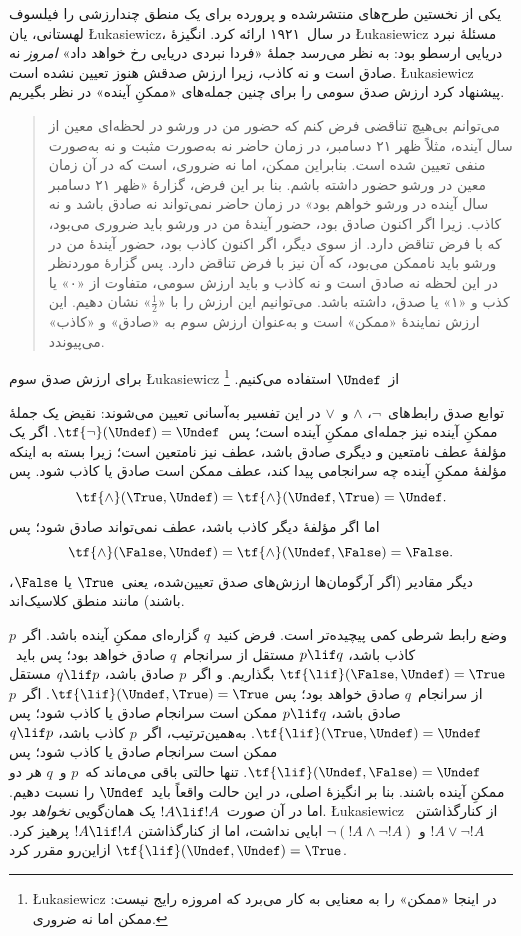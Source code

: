 \documentclass[../../../include/open-logic-section]{subfiles}
\begin{document}


یکی از نخستین طرح‌های منتشرشده و پرورده برای یک منطق چندارزشی را
فیلسوف لهستانی، یان \L ukasiewicz، در سال~۱۹۲۱ ارائه کرد. انگیزهٔ
\L ukasiewicz مسئلهٔ نبرد دریایی ارسطو بود: به نظر می‌رسد جملهٔ «فردا
نبردی دریایی رخ خواهد داد» \emph{امروز} نه صادق است و نه کاذب، زیرا
ارزش صدقش هنوز تعیین نشده است. \L ukasiewicz پیشنهاد کرد ارزش صدق
سومی را برای چنین جمله‌های «ممکنِ آینده» در نظر بگیریم.
\begin{quote}
می‌توانم بی‌هیچ تناقضی فرض کنم که حضور من در ورشو در لحظه‌ای معین از
سال آینده، مثلاً ظهر ۲۱ دسامبر، در زمان حاضر نه به‌صورت مثبت و نه
به‌صورت منفی تعیین شده است. بنابراین ممکن، اما نه ضروری، است که در آن
زمان معین در ورشو حضور داشته باشم. بنا بر این فرض، گزارهٔ «ظهر ۲۱
دسامبر سال آینده در ورشو خواهم بود» در زمان حاضر نمی‌تواند نه صادق
باشد و نه کاذب. زیرا اگر اکنون صادق بود، حضور آیندهٔ من در ورشو باید
ضروری می‌بود، که با فرض تناقض دارد. از سوی دیگر، اگر اکنون کاذب بود،
حضور آیندهٔ من در ورشو باید ناممکن می‌بود، که آن نیز با فرض تناقض
دارد. پس گزارهٔ موردنظر در این لحظه نه صادق است و نه کاذب و باید ارزش
سومی، متفاوت از «۰» یا کذب و «۱» یا صدق، داشته باشد. می‌توانیم این
ارزش را با «$\frac{1}{2}$» نشان دهیم. این ارزش نمایندهٔ «ممکن» است و
به‌عنوان ارزش سوم به «صادق» و «کاذب» می‌پیوندد.
\end{quote}
برای ارزش صدق سوم \L ukasiewicz از~$\Undef$ استفاده می‌کنیم.
\footnote{\L ukasiewicz در اینجا «ممکن» را به معنایی به کار می‌برد که
امروزه رایج نیست: ممکن اما نه ضروری.}

توابع صدق رابط‌های~$\lnot$، $\land$ و~$\lor$ در این تفسیر به‌آسانی
تعیین می‌شوند: نقیض یک جملهٔ ممکنِ آینده نیز جمله‌ای ممکنِ آینده است؛
پس~$\tf{\lnot}(\Undef) = \Undef$. اگر یک مؤلفهٔ عطف نامتعین و دیگری
صادق باشد، عطف نیز نامتعین است؛ زیرا بسته به اینکه مؤلفهٔ ممکنِ آینده
چه سرانجامی پیدا کند، عطف ممکن است صادق یا کاذب شود. پس
\[
    \tf{\land}(\True, \Undef) =
\tf{\land}(\Undef, \True) =
\Undef.
\]
اما اگر مؤلفهٔ دیگر کاذب باشد، عطف نمی‌تواند صادق شود؛ پس
\[\tf{\land}(\False, \Undef) =
\tf{\land}(\Undef, \False) = \False.\]
دیگر مقادیر (اگر آرگومان‌ها ارزش‌های صدق تعیین‌شده، یعنی~$\True$ یا
$\False$، باشند) مانند منطق کلاسیک‌اند.

وضع رابط شرطی کمی پیچیده‌تر است. فرض کنید~$q$ گزاره‌ای ممکنِ آینده
باشد. اگر~$p$ کاذب باشد، $p \lif q$ مستقل از سرانجام~$q$ صادق خواهد
بود؛ پس باید~$\tf{\lif}(\False, \Undef) = \True$ بگذاریم. و اگر~$p$
صادق باشد، $q \lif p$ مستقل از سرانجام~$q$ صادق خواهد بود؛ پس
$\tf{\lif}(\Undef, \True) = \True$. اگر~$p$ صادق باشد، $p \lif q$
ممکن است سرانجام صادق یا کاذب شود؛ پس
$\tf{\lif}(\True, \Undef) = \Undef$. به‌همین‌ترتیب، اگر~$p$ کاذب
باشد، $q \lif p$ ممکن است سرانجام صادق یا کاذب شود؛ پس
$\tf{\lif}(\Undef, \False) = \Undef$. تنها حالتی باقی می‌ماند که~$p$
و~$q$ هر دو ممکنِ آینده باشند. بنا بر انگیزهٔ اصلی، در این حالت واقعاً
باید~$\Undef$ را نسبت دهیم. اما در آن صورت~$!A \lif !A$ یک همان‌گویی
\emph{نخواهد بود}. \L ukasiewicz از کنارگذاشتن~$!A \lor \lnot !A$ و
$\lnot(!A \land \lnot !A)$ ابایی نداشت، اما از کنارگذاشتن
$!A \lif !A$ پرهیز کرد. ازاین‌رو مقرر کرد
$\tf{\lif}(\Undef, \Undef) = \True$.
\end{document}
